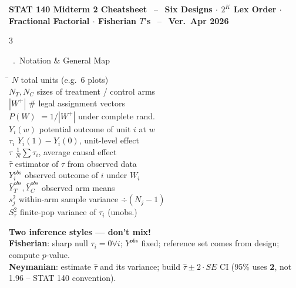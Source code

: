 \documentclass[10pt,landscape]{article}
\newcounter{secN}
\newcommand{\Sec}[1]{%
  \stepcounter{secN}%
  \vspace{3pt}\par\noindent
  \colorbox{hdr}{\color{white}\footnotesize\bfseries\parbox{0.95\columnwidth}{\strut\ \arabic{secN}.\ #1}}\par\vspace{1pt}}
\newcommand{\key}[1]{\textbf{\color{acc}#1}}
\begin{document}
\small

\begin{center}
\colorbox{hdr}{\parbox{0.995\textwidth}{\centering\color{white}\textbf{\normalsize STAT 140 Midterm 2 Cheatsheet} \ -- \ \textbf{\footnotesize Six Designs $\cdot$ $2^K$ Lex Order $\cdot$ Fractional Factorial $\cdot$ Fisherian $T$'s} \ -- \ \textbf{\footnotesize Ver.\ Apr 2026}}}
\end{center}
\vspace{-6pt}

\begin{multicols*}{3}

\Sec{Notation \& General Map}
\vspace{-2pt}
\begin{tabbing}
\hspace{1.15cm}\=\kill
$N$ \> total units (e.g.\ 6 plots) \\
$N_T,N_C$ \> sizes of treatment / control arms \\
$|W^+|$ \> \# legal assignment vectors \\
$P(W)$ \> $=1/|W^+|$ under complete rand. \\
$Y_i(w)$ \> potential outcome of unit $i$ at $w$ \\
$\tau_i$ \> $Y_i(1)-Y_i(0)$, unit-level effect \\
$\tau$ \> $\tfrac1N\sum\tau_i$, average causal effect \\
$\hat\tau$ \> estimator of $\tau$ from observed data \\
$Y_i^{obs}$ \> observed outcome of $i$ under $W_i$ \\
$\bar Y_T^{obs},\bar Y_C^{obs}$ \> observed arm means \\
$s_j^2$ \> within-arm sample variance $\div(N_j{-}1)$ \\
$S_\tau^2$ \> finite-pop variance of $\tau_i$ (unobs.) \\
\end{tabbing}
\vspace{-6pt}

\begin{infobox}
\textbf{Two inference styles — don't mix!}\\[1pt]
\key{Fisherian}: sharp null $\tau_i=0\forall i$; $Y^{obs}$ fixed; reference set comes from design; compute $p$-value.\\[1pt]
\key{Neymanian}: estimate $\hat\tau$ and its variance; build $\hat\tau\pm 2\cdot SE$ CI (95\% uses \textbf{2}, not 1.96 -- STAT 140 convention).
\end{infobox}


\end{multicols*}
\end{document}
